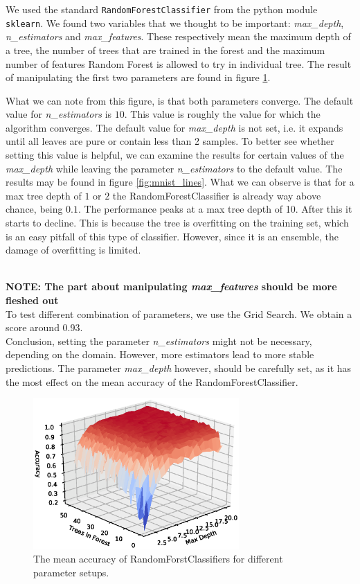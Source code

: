 \documentclass[11pt]{article}
\begin{document}
We used the standard \texttt{RandomForestClassifier} from the python module \texttt{sklearn}. We found two variables that we thought to be important: \textit{max\_depth}, \textit{n\_estimators} and \textit{max\_features}. These respectively mean the maximum depth of a tree, the number of trees that are trained in the forest and the maximum number of features Random Forest is allowed to try in individual tree. The result of manipulating the first two parameters are found in figure \ref{fig:mnist_results}.

What we can note from this figure, is that both parameters converge. The default value for \textit{n\_estimators} is $10$. This value is roughly the value for which the algorithm converges. The default value for \textit{max\_depth} is not set, i.e. it expands until all leaves are pure or contain less than 2 samples. To better see whether setting this value is helpful, we can examine the results for certain values of the \textit{max\_depth} while leaving the parameter \textit{n\_estimators} to the default value. The results may be found in figure \ref{fig:mnist_lines}. What we can observe is that for a max tree depth of $1$ or $2$ the RandomForestClassifier is already way above chance, being $0.1$. The performance peaks at a max tree depth of 10. After this it starts to decline. This is because the tree is overfitting on the training set, which is an easy pitfall of this type of classifier. However, since it is an ensemble, the damage of overfitting is limited.

~\\ \textbf{NOTE: The part about manipulating \textit{max\_features} should be more fleshed out} \\
To test different combination of parameters, we use the Grid Search. We obtain a score around 0.93.
~\\

Conclusion, setting the parameter \textit{n\_estimators} might not be necessary, depending on the domain. However, more estimators lead to more stable predictions. The parameter \textit{max\_depth} however, should be carefully set, as it has the most effect on the mean accuracy of the RandomForestClassifier.

\begin{figure}[H]
\centering
\includegraphics[width=0.7\textwidth]{images/mnist_results.eps}
\caption{The mean accuracy of RandomForstClassifiers for different parameter setups.}
\label{fig:mnist_results}
\end{figure}
\end{document}
